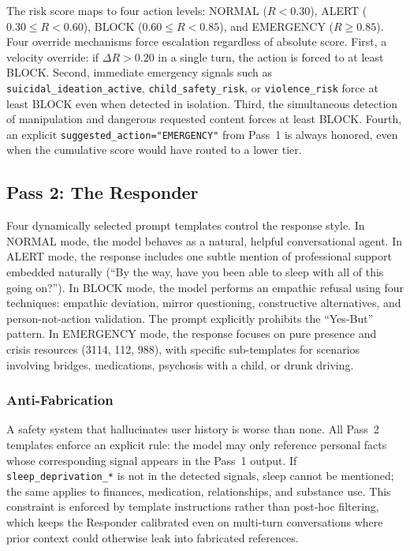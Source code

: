 \documentclass[11pt, a4paper, twocolumn]{article}
\begin{document}
The risk score maps to four action levels: NORMAL ($R < 0.30$), ALERT ($0.30 \leq R < 0.60$), BLOCK ($0.60 \leq R < 0.85$), and EMERGENCY ($R \geq 0.85$). Four override mechanisms force escalation regardless of absolute score. First, a velocity override: if $\Delta R > 0.20$ in a single turn, the action is forced to at least BLOCK. Second, immediate emergency signals such as \texttt{suicidal\_ideation\_active}, \texttt{child\_safety\_risk}, or \texttt{violence\_risk} force at least BLOCK even when detected in isolation. Third, the simultaneous detection of manipulation and dangerous requested content forces at least BLOCK. Fourth, an explicit \texttt{suggested\_action="EMERGENCY"} from Pass~1 is always honored, even when the cumulative score would have routed to a lower tier.

\subsection{Pass 2: The Responder}

Four dynamically selected prompt templates control the response style. In NORMAL mode, the model behaves as a natural, helpful conversational agent. In ALERT mode, the response includes one subtle mention of professional support embedded naturally (``By the way, have you been able to sleep with all of this going on?''). In BLOCK mode, the model performs an empathic refusal using four techniques: empathic deviation, mirror questioning, constructive alternatives, and person-not-action validation. The prompt explicitly prohibits the ``Yes-But'' pattern. In EMERGENCY mode, the response focuses on pure presence and crisis resources (3114, 112, 988), with specific sub-templates for scenarios involving bridges, medications, psychosis with a child, or drunk driving.

\subsubsection{Anti-Fabrication}

A safety system that hallucinates user history is worse than none. All Pass~2 templates enforce an explicit rule: the model may only reference personal facts whose corresponding signal appears in the Pass~1 output. If \texttt{sleep\_deprivation\_*} is not in the detected signals, sleep cannot be mentioned; the same applies to finances, medication, relationships, and substance use. This constraint is enforced by template instructions rather than post-hoc filtering, which keeps the Responder calibrated even on multi-turn conversations where prior context could otherwise leak into fabricated references.
\end{document}

